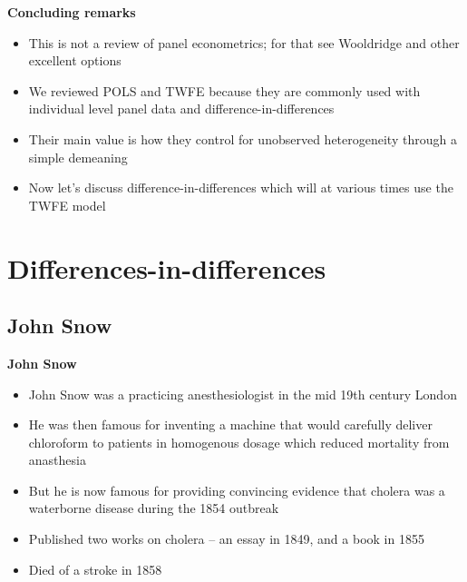 \documentclass[notes=show]{beamer}
\begin{document}
\begin{frame}[plain]
\begin{center}
\textbf{Concluding remarks}
\end{center}

\begin{itemize}
\item This is not a review of panel econometrics; for that see Wooldridge and other excellent options
\item We reviewed POLS and TWFE because they are commonly used with individual level panel data and difference-in-differences
\item Their main value is how they control for unobserved heterogeneity through a simple demeaning
\item Now let's discuss difference-in-differences which will at various times use the TWFE model
\end{itemize}

\end{frame}

\section{Differences-in-differences}

\subsection{John Snow}

\begin{frame}
\begin{center}
\textbf{John Snow}
\end{center}

\begin{itemize}
\item John Snow was a practicing anesthesiologist in the mid 19th century London
\item He was then famous for inventing a machine that would carefully deliver chloroform to patients in homogenous dosage which reduced mortality from anasthesia
\item But he is now famous for providing convincing evidence that cholera was a waterborne disease during the 1854 outbreak
\item Published two works on cholera -- an essay in 1849, and a book in 1855
\item Died of a stroke in 1858
\end{itemize}

\end{frame}
\end{document}
